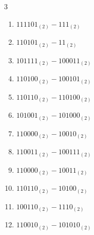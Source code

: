 


\setcounter{quesnum}{30}

\begin{multicols}{3}
\begin{enumerate}
  \itemsep=30pt
  \item $111101_{(2)} - 111_{(2)}$


  \item $110101_{(2)} - 11_{(2)}$


  \item $101111_{(2)} - 100011_{(2)}$


  \item $110100_{(2)} - 100101_{(2)}$


  \item $110110_{(2)} - 110100_{(2)}$


  \item $101001_{(2)} - 101000_{(2)}$


  \item $110000_{(2)} - 10010_{(2)}$


  \item $110011_{(2)} - 100111_{(2)}$


  \item $110000_{(2)} - 10011_{(2)}$


  \item $110110_{(2)} - 10100_{(2)}$


\columnbreak %

  \item $100110_{(2)} - 1110_{(2)}$


  \item $110010_{(2)} - 101010_{(2)}$


\end{enumerate}
\end{multicols}
